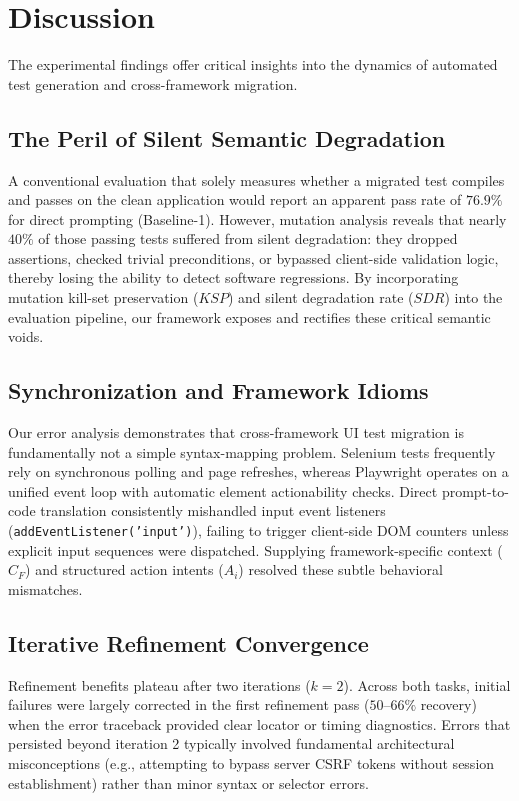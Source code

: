 \documentclass[pdflatex,sn-mathphys-num]{sn-jnl}
\begin{document}
\section{Discussion}
\label{sec:discussion}

The experimental findings offer critical insights into the dynamics of automated
test generation and cross-framework migration.

\subsection{The Peril of Silent Semantic Degradation}
A conventional evaluation that solely measures whether a migrated test compiles
and passes on the clean application would report an apparent pass rate of $76.9\%$
for direct prompting (Baseline-1). However, mutation analysis reveals that nearly
$40\%$ of those passing tests suffered from silent degradation: they dropped
assertions, checked trivial preconditions, or bypassed client-side validation logic,
thereby losing the ability to detect software regressions. By incorporating mutation
kill-set preservation ($KSP$) and silent degradation rate ($SDR$) into the evaluation
pipeline, our framework exposes and rectifies these critical semantic voids.

\subsection{Synchronization and Framework Idioms}
Our error analysis demonstrates that cross-framework UI test migration is fundamentally
not a simple syntax-mapping problem. Selenium tests frequently rely on synchronous
polling and page refreshes, whereas Playwright operates on a unified event loop with
automatic element actionability checks. Direct prompt-to-code translation consistently
mishandled input event listeners (\texttt{addEventListener('input')}), failing to trigger
client-side DOM counters unless explicit input sequences were dispatched. Supplying
framework-specific context ($C_F$) and structured action intents ($A_i$) resolved
these subtle behavioral mismatches.

\subsection{Iterative Refinement Convergence}
Refinement benefits plateau after two iterations ($k=2$). Across both tasks, initial
failures were largely corrected in the first refinement pass ($50$--$66\%$ recovery)
when the error traceback provided clear locator or timing diagnostics. Errors that
persisted beyond iteration 2 typically involved fundamental architectural misconceptions
(e.g., attempting to bypass server CSRF tokens without session establishment) rather
than minor syntax or selector errors.
\end{document}

